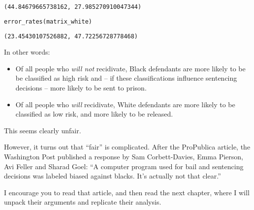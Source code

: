 \begin{lstlisting}[style=output]
(44.84679665738162, 27.985270910047344)
\end{lstlisting}

\begin{lstlisting}[language=Python,style=source]
error_rates(matrix_white)
\end{lstlisting}

\begin{lstlisting}[style=output]
(23.45430107526882, 47.72256728778468)
\end{lstlisting}

In other words:

\begin{itemize}
\item
  Of all people who \emph{will not} recidivate, Black defendants are
  more likely to be be classified as high risk and -- if these
  classifications influence sentencing decisions -- more likely to be
  sent to prison.
\item
  Of all people who \emph{will} recidivate, White defendants are more
  likely to be classified as low risk, and more likely to be released.
\end{itemize}

This seems clearly unfair.

However, it turns out that ``fair'' is complicated. After the ProPublica
article, the Washington Post published a response by Sam Corbett-Davies,
Emma Pierson, Avi Feller and Sharad Goel: ``A computer program used for
bail and sentencing decisions was labeled biased against blacks. It's
actually not that clear.''

I encourage you to read that article, and then read the next chapter,
where I will unpack their arguments and replicate their analysis.

